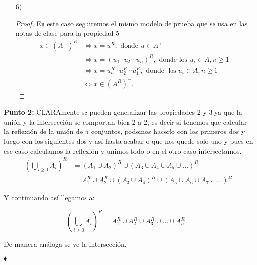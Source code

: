 \begin{itemize}
     \item[6)] 
   \begin{proof}En este caso seguiremos el mismo modelo de prueba que se usa en las notas de clase para la propiedad 5
        $$
    \begin{aligned}
    x \in\left(A^+\right)^R & \Longleftrightarrow x=u^R, \text { donde } u \in A^+ \\
    & \Longleftrightarrow x=\left(u_1 \cdot u_2 \cdots u_n\right)^R, \text { donde los } u_i \in A, n \geq 1 \\
    & \Longleftrightarrow x=u_n^R \cdot u_2^R \cdots u_1^R, \text { donde } \operatorname{los} u_i \in A, n \geq 1 \\
    & \Longleftrightarrow x \in\left(A^R\right)^+ .
    \end{aligned}
    $$
   \end{proof}
\end{itemize}

\textbf{Punto 2:} CLARAmente se pueden generalizar las propiedades 2 y 3 ya que la unión y la intersección se comportan bien 2 a 2, es decir si tenemos que calcular la reflexión de la unión de $n$ conjuntos, podemos hacerlo con los primeros dos y luego con los siguientes dos y así hasta acabar o que nos quede solo uno y pues en ese caso calculamos la reflexión y unimos todo o en el otro caso intersectamos.\\

\begin{align*}
\displaystyle\left(\bigcup_{i \geq 0} A_i\right)^R&=(A_1\cup A_2)^R\cup (A_3\cup A_4\cup A_5\cup ...)^R\\
&=A_1^R\cup A_2^R\cup (A_3\cup A_4)^R\cup (A_5\cup A_6\cup A_7\cup ...)^R
\end{align*}

Y continuando así llegamos a:

$$\displaystyle\left(\bigcup_{i \geq 0} A_i\right)^R=A_1^R\cup A_2^R\cup A_3^R\cup...\cup A_n^R...$$

De manera análoga se ve la intersección.

\hfill $\blacklozenge$